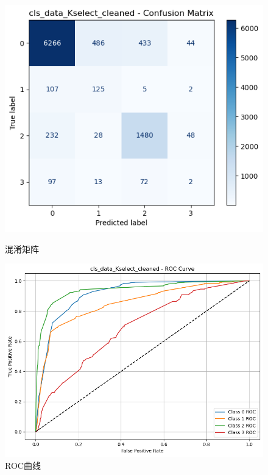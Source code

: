 \documentclass[10pt]{article}
\begin{document}
\begin{figure}[H]
\centering
\begin{minipage}[t]{0.45\textwidth}
  \centering
  \includegraphics[width=\linewidth]{cls_nb_10sc.png}
  \caption{混淆矩阵}
  \label{fig:61}
\end{minipage}
\hfill
\begin{minipage}[t]{0.52\textwidth}
  \centering
  \includegraphics[width=\linewidth]{cls_nb_10sc2.png}
  \caption{ROC曲线}
  \label{fig:62}
\end{minipage}
\end{figure}
\end{document}
